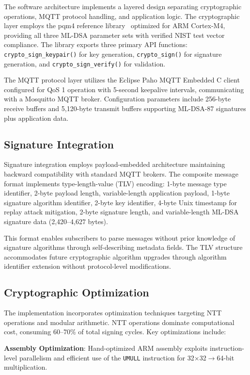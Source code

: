 \documentclass[final, twoside]{IEEEtran} %
\begin{document}
The software architecture implements a layered design separating cryptographic operations, MQTT protocol handling, and application logic. The cryptographic layer employs the pqm4 reference library~\cite{pqm4-benchmarks} optimized for ARM Cortex-M4, providing all three ML-DSA parameter sets with verified NIST test vector compliance. The library exports three primary API functions: \texttt{crypto\_sign\_keypair()} for key generation, \texttt{crypto\_sign()} for signature generation, and \texttt{crypto\_sign\_verify()} for validation.

The MQTT protocol layer utilizes the Eclipse Paho MQTT Embedded C client configured for QoS 1 operation with 5-second keepalive intervals, communicating with a Mosquitto MQTT broker. Configuration parameters include 256-byte receive buffers and 5,120-byte transmit buffers supporting ML-DSA-87 signatures plus application data.

\subsection{Signature Integration}

Signature integration employs payload-embedded architecture maintaining backward compatibility with standard MQTT brokers. The composite message format implements type-length-value (TLV) encoding: 1-byte message type identifier, 2-byte payload length, variable-length application payload, 1-byte signature algorithm identifier, 2-byte key identifier, 4-byte Unix timestamp for replay attack mitigation, 2-byte signature length, and variable-length ML-DSA signature data (2,420--4,627 bytes).

This format enables subscribers to parse messages without prior knowledge of signature algorithms through self-describing metadata fields. The TLV structure accommodates future cryptographic algorithm upgrades through algorithm identifier extension without protocol-level modifications.

\subsection{Cryptographic Optimization}

The implementation incorporates optimization techniques targeting NTT operations and modular arithmetic. NTT operations dominate computational cost, consuming 60--70\% of total signing cycles. Key optimizations include:

\textbf{Assembly Optimization}: Hand-optimized ARM assembly exploits instruction-level parallelism and efficient use of the \texttt{UMULL} instruction for 32$\times$32$\rightarrow$64-bit multiplication.
\end{document}
